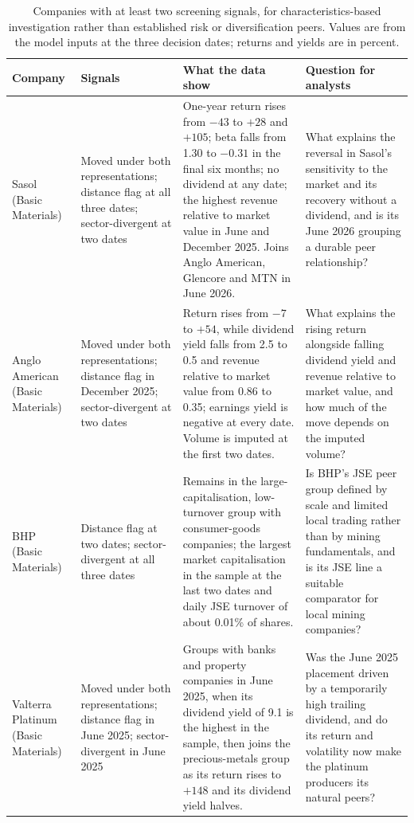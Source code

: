 \begin{table}[htbp]
\centering
\caption{Companies with at least two screening signals, for characteristics-based investigation rather than established risk or diversification peers. Values are from the model inputs at the three decision dates; returns and yields are in percent.}\label{tab:analyst}
\scriptsize
\begin{tabularx}{\linewidth}{@{}>{\raggedright\arraybackslash}p{2.0cm}>{\raggedright\arraybackslash}p{2.3cm}>{\raggedright\arraybackslash}X>{\raggedright\arraybackslash}X@{}}
\toprule
Company & Signals & What the data show & Question for analysts \\
\midrule
Sasol (Basic Materials) & Moved under both representations; distance flag at all three dates; sector-divergent at two dates & One-year return rises from $-43$ to $+28$ and $+105$; beta falls from 1.30 to $-0.31$ in the final six months; no dividend at any date; the highest revenue relative to market value in June and December 2025. Joins Anglo American, Glencore and MTN in June 2026. & What explains the reversal in Sasol's sensitivity to the market and its recovery without a dividend, and is its June 2026 grouping a durable peer relationship? \\
\addlinespace
Anglo American (Basic Materials) & Moved under both representations; distance flag in December 2025; sector-divergent at two dates & Return rises from $-7$ to $+54$, while dividend yield falls from 2.5 to 0.5 and revenue relative to market value from 0.86 to 0.35; earnings yield is negative at every date. Volume is imputed at the first two dates. & What explains the rising return alongside falling dividend yield and revenue relative to market value, and how much of the move depends on the imputed volume? \\
\addlinespace
BHP (Basic Materials) & Distance flag at two dates; sector-divergent at all three dates & Remains in the large-capitalisation, low-turnover group with consumer-goods companies; the largest market capitalisation in the sample at the last two dates and daily JSE turnover of about 0.01\% of shares. & Is BHP's JSE peer group defined by scale and limited local trading rather than by mining fundamentals, and is its JSE line a suitable comparator for local mining companies? \\
\addlinespace
Valterra Platinum (Basic Materials) & Moved under both representations; distance flag in June 2025; sector-divergent in June 2025 & Groups with banks and property companies in June 2025, when its dividend yield of 9.1 is the highest in the sample, then joins the precious-metals group as its return rises to $+148$ and its dividend yield halves. & Was the June 2025 placement driven by a temporarily high trailing dividend, and do its return and volatility now make the platinum producers its natural peers? \\

\end{tabularx}
\end{table}
